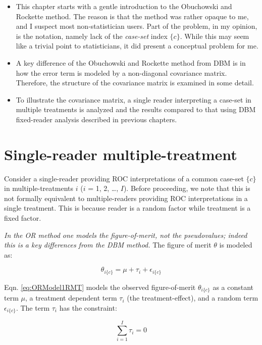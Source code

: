\documentclass[
]{book}
\begin{document}
\begin{itemize}
\item
  This chapter starts with a gentle introduction to the Obuchowski and Rockette method. The reason is that the method was rather opaque to me, and I suspect most non-statistician users. Part of the problem, in my opinion, is the notation, namely lack of the \emph{case-set} index \(\{c\}\). While this may seem like a trivial point to statisticians, it did present a conceptual problem for me.
\item
  A key difference of the Obuchowski and Rockette method from DBM is in how the error term is modeled by a non-diagonal covariance matrix. Therefore, the structure of the covariance matrix is examined in some detail.
\item
  To illustrate the covariance matrix, a single reader interpreting a case-set in multiple treatments is analyzed and the results compared to that using DBM fixed-reader analysis described in previous chapters.
\end{itemize}

\hypertarget{OR1RMTModel}{%
\section{Single-reader multiple-treatment}\label{OR1RMTModel}}

Consider a single-reader providing ROC interpretations of a common case-set \(\{c\}\) in multiple-treatments \(i\) (\(i\) = 1, 2, \ldots, \(I\)). Before proceeding, we note that this is not formally equivalent to multiple-readers providing ROC interpretations in a single treatment. This is because reader is a random factor while treatment is a fixed factor.

\emph{In the OR method one models the figure-of-merit, not the pseudovalues; indeed this is a key differences from the DBM method.} The figure of merit \(\theta\) is modeled as:

\begin{equation}
\theta_{i\{c\}}=\mu+\tau_i+\epsilon_{i\{c\}}
\label{eq:ORModel1RMT}
\end{equation}

Eqn. \eqref{eq:ORModel1RMT} models the observed figure-of-merit \(\theta_{i\{c\}}\) as a constant term \(\mu\), a treatment dependent term \(\tau_i\) (the treatment-effect), and a random term \(\epsilon_{i\{c\}}\). The term \(\tau_i\) has the constraint:

\begin{equation}
\sum_{i=1}^{I}\tau_i=0
\label{eq:ConstraintTau}
\end{equation}
\end{document}
